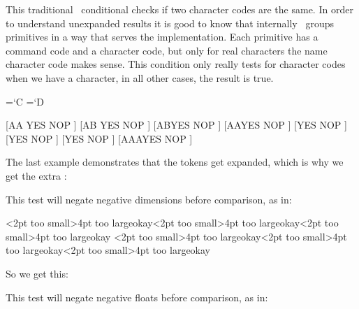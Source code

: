 \stopoldprimitive

\startoldprimitive[title={\prm {if}}]

This traditional \TEX\ conditional checks if two character codes are the same. In
order to understand unexpanded results it is good to know that internally \TEX\
groups primitives in a way that serves the implementation. Each primitive has a
command code and a character code, but only for real characters the name
character code makes sense. This condition only really tests for character codes
when we have a character, in all other cases, the result is true.

\startbuffer
\def\A{A}\def\B{B} \chardef\C=`C \chardef\D=`D \def\AA{AA}

[\if AA   YES \else NOP \fi] [\if AB   YES \else NOP \fi]
[\if \A\B YES \else NOP \fi] [\if \A\A YES \else NOP \fi]
[\if \C\D YES \else NOP \fi] [\if \C\C YES \else NOP \fi]
[\if \count\dimen YES \else NOP \fi] [\if \AA\A YES \else NOP \fi]

\stopbuffer

\typebuffer

The last example demonstrates that the tokens get expanded, which is why
we get the extra \type {A}:

{\getbuffer}

\stopoldprimitive

\startnewprimitive[title={\prm {ifabsdim}}]

This test will negate negative dimensions before comparison, as in:

\startbuffer
\def\TestA#1{\ifdim   #1<2pt too small\orelse\ifdim   #1>4pt too large\else okay\fi}
\def\TestB#1{\ifabsdim#1<2pt too small\orelse\ifabsdim#1>4pt too large\else okay\fi}

\TestA {1pt}\quad\TestA {3pt}\quad\TestA {5pt}\crlf
\TestB {1pt}\quad\TestB {3pt}\quad\TestB {5pt}\crlf
\TestB{-1pt}\quad\TestB{-3pt}\quad\TestB{-5pt}\par
\stopbuffer

\typebuffer

So we get this:

{\getbuffer}

\stopnewprimitive

\startnewprimitive[title={\prm {ifabsfloat}}]

This test will negate negative floats before comparison, as in:

\startbuffer
\def\TestA#1{\iffloat   #1<2.46 small\orelse\iffloat   #1>4.68 large\else medium\fi}
\def\TestB#1{\ifabsfloat#1<2.46 small\orelse\ifabsfloat#1>4.68 large\else medium\fi}

